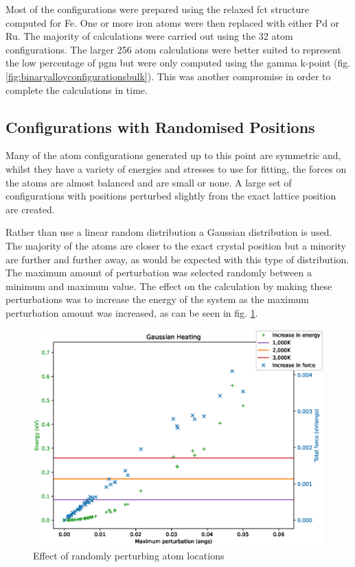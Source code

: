 Most of the configurations were prepared using the relaxed \acrshort{fct} structure computed for Fe.  One or more iron atoms were then replaced with either Pd or Ru.  The majority of calculations were carried out using the 32 atom configurations.  The larger 256 atom calculations were better suited to represent the low percentage of \acrshort{pgm} but were only computed using the gamma k-point (fig. \ref{fig:binaryalloyconfigurationsbulk}).  This was another compromise in order to complete the calculations in time.



\subsection{Configurations with Randomised Positions}

Many of the atom configurations generated up to this point are symmetric and, whilst they have a variety of energies and stresses to use for fitting, the forces on the atoms are almost balanced and are small or none.  A large set of configurations with positions perturbed slightly from the exact lattice position are created.

Rather than use a linear random distribution a Gaussian distribution is used.  The majority of the atoms are closer to the exact crystal position but a minority are further and further away, as would be expected with this type of distribution.  The maximum amount of perturbation was selected randomly between a minimum and maximum value.  The effect on the calculation by making these perturbations was to increase the energy of the system as the maximum perturbation amount was increased, as can be seen in fig. \ref{fig:pwheatal}.

\begin{figure}[h]
\begin{center}
\includegraphics[scale=0.60]{chapters/potentials_fe_pd_ru/pwheat/al/alheat.eps}
\caption{Effect of randomly perturbing atom locations}
\label{fig:pwheatal}
\end{center}
\end{figure}

